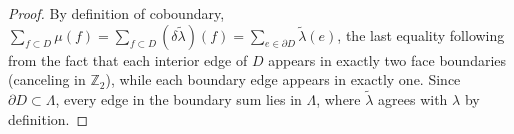 \documentclass[10pt,a4paper]{amsart}
\newcommand{\Z}{\mathbb{Z}} %
\newcommand{\cgraph}{\Lambda} %
\newcommand{\coboundary}{\delta} %
\newcommand{\coupling}{\lambda} %
\begin{document}
\begin{proof}
By definition of coboundary, $\sum_{f \subset D} \mu(f) = \sum_{f \subset D} (\coboundary\tilde{\coupling})(f) = \sum_{e \in \partial D} \tilde{\coupling}(e)$, the last equality following from the fact that each interior edge of $D$ appears in exactly two face boundaries (canceling in $\Z_2$), while each boundary edge appears in exactly one. Since $\partial D \subset \cgraph$, every edge in the boundary sum lies in $\cgraph$, where $\tilde{\coupling}$ agrees with $\coupling$ by definition.
\end{proof}
\end{document}
